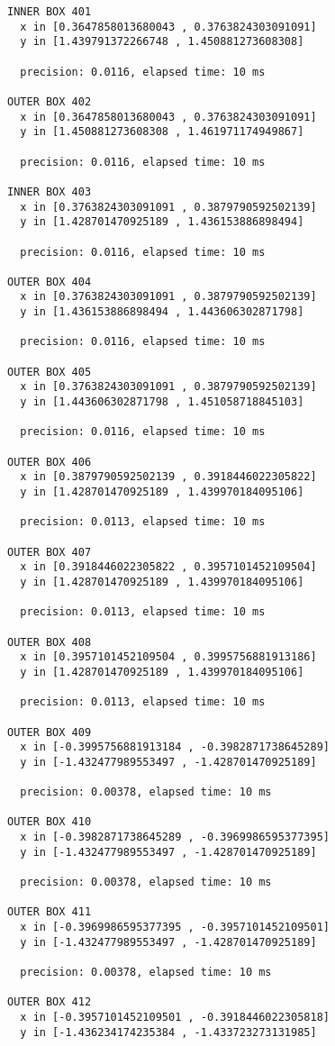 \begin{verbatim}
INNER BOX 401
  x in [0.3647858013680043 , 0.3763824303091091]
  y in [1.439791372266748 , 1.450881273608308]

  precision: 0.0116, elapsed time: 10 ms

OUTER BOX 402
  x in [0.3647858013680043 , 0.3763824303091091]
  y in [1.450881273608308 , 1.461971174949867]

  precision: 0.0116, elapsed time: 10 ms

INNER BOX 403
  x in [0.3763824303091091 , 0.3879790592502139]
  y in [1.428701470925189 , 1.436153886898494]

  precision: 0.0116, elapsed time: 10 ms

OUTER BOX 404
  x in [0.3763824303091091 , 0.3879790592502139]
  y in [1.436153886898494 , 1.443606302871798]

  precision: 0.0116, elapsed time: 10 ms

OUTER BOX 405
  x in [0.3763824303091091 , 0.3879790592502139]
  y in [1.443606302871798 , 1.451058718845103]

  precision: 0.0116, elapsed time: 10 ms

OUTER BOX 406
  x in [0.3879790592502139 , 0.3918446022305822]
  y in [1.428701470925189 , 1.439970184095106]

  precision: 0.0113, elapsed time: 10 ms

OUTER BOX 407
  x in [0.3918446022305822 , 0.3957101452109504]
  y in [1.428701470925189 , 1.439970184095106]

  precision: 0.0113, elapsed time: 10 ms

OUTER BOX 408
  x in [0.3957101452109504 , 0.3995756881913186]
  y in [1.428701470925189 , 1.439970184095106]

  precision: 0.0113, elapsed time: 10 ms

OUTER BOX 409
  x in [-0.3995756881913184 , -0.3982871738645289]
  y in [-1.432477989553497 , -1.428701470925189]

  precision: 0.00378, elapsed time: 10 ms

OUTER BOX 410
  x in [-0.3982871738645289 , -0.3969986595377395]
  y in [-1.432477989553497 , -1.428701470925189]

  precision: 0.00378, elapsed time: 10 ms

OUTER BOX 411
  x in [-0.3969986595377395 , -0.3957101452109501]
  y in [-1.432477989553497 , -1.428701470925189]

  precision: 0.00378, elapsed time: 10 ms

OUTER BOX 412
  x in [-0.3957101452109501 , -0.3918446022305818]
  y in [-1.436234174235384 , -1.433723273131985]


\end{verbatim}
